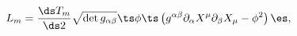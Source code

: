 \begin{equation}
L_m =\frac{\ds T_m}{\ds 2} 
\sqrt{\det g_{\alpha \beta}} \ts 
\phi \ts \left( g^{\alpha \beta} \partial _\alpha X^\mu \partial_\beta X_\mu 
- \phi^2 \right) \es,
\label{eq:LgrgnMmbrn}
\end{equation}

